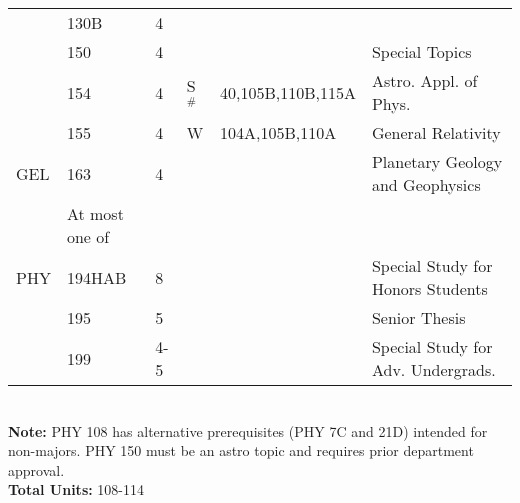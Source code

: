 \documentclass[12pt]{article}
\begin{document}
\begin{tabular}{|llllll|}
    & 130B & 4 &  &  & \\  
    & 150  & 4 &  &  & Special Topics\\  
    & 154  & 4 & S$^\#$ & 40,105B,110B,115A & Astro. Appl. of Phys. \\
    & 155  & 4 & W   & 104A,105B,110A & General Relativity \\ 
GEL & 163  & 4 &  &  & Planetary Geology and Geophysics\\ 
 & At most one of &  &  &  & \\ 
PHY & 194HAB & 8 &  &  & Special Study for Honors Students\\ 
    & 195  & 5 &  &  & Senior Thesis\\ 
    & 199  & 4-5 &  &  & Special Study for Adv. Undergrads.\\ 
\hline
\end{tabular}\\
\vskip 0.25cm
\noindent
{\bf Note:} PHY 108 has alternative prerequisites (PHY 7C and 21D)
intended for non-majors.  PHY 150 must be an astro topic and requires
prior department approval.\\
\noindent
{\bf Total Units:} 108-114 \\
\end{document}
